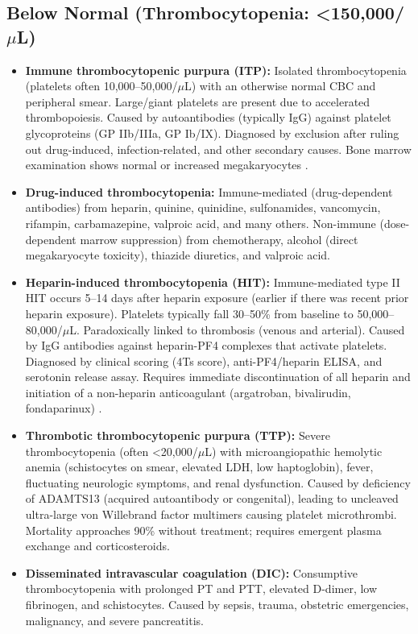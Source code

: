 \subsection*{Below Normal (Thrombocytopenia: <150,000/$\mu$L)}
\begin{itemize}
  \item \textbf{Immune thrombocytopenic purpura (ITP):} Isolated thrombocytopenia (platelets often 10,000--50,000/$\mu$L) with an otherwise normal CBC and peripheral smear. Large/giant platelets are present due to accelerated thrombopoiesis. Caused by autoantibodies (typically IgG) against platelet glycoproteins (GP IIb/IIIa, GP Ib/IX). Diagnosed by exclusion after ruling out drug-induced, infection-related, and other secondary causes. Bone marrow examination shows normal or increased megakaryocytes \cite{neunert2019american}.
  \item \textbf{Drug-induced thrombocytopenia:} Immune-mediated (drug-dependent antibodies) from heparin, quinine, quinidine, sulfonamides, vancomycin, rifampin, carbamazepine, valproic acid, and many others. Non-immune (dose-dependent marrow suppression) from chemotherapy, alcohol (direct megakaryocyte toxicity), thiazide diuretics, and valproic acid.
  \item \textbf{Heparin-induced thrombocytopenia (HIT):} Immune-mediated type II HIT occurs 5--14 days after heparin exposure (earlier if there was recent prior heparin exposure). Platelets typically fall 30--50\% from baseline to 50,000--80,000/$\mu$L. Paradoxically linked to thrombosis (venous and arterial). Caused by IgG antibodies against heparin-PF4 complexes that activate platelets. Diagnosed by clinical scoring (4Ts score), anti-PF4/heparin ELISA, and serotonin release assay. Requires immediate discontinuation of all heparin and initiation of a non-heparin anticoagulant (argatroban, bivalirudin, fondaparinux) \cite{greinacher2015heparin}.
  \item \textbf{Thrombotic thrombocytopenic purpura (TTP):} Severe thrombocytopenia (often <20,000/$\mu$L) with microangiopathic hemolytic anemia (schistocytes on smear, elevated LDH, low haptoglobin), fever, fluctuating neurologic symptoms, and renal dysfunction. Caused by deficiency of ADAMTS13 (acquired autoantibody or congenital), leading to uncleaved ultra-large von Willebrand factor multimers causing platelet microthrombi. Mortality approaches 90\% without treatment; requires emergent plasma exchange and corticosteroids.
  \item \textbf{Disseminated intravascular coagulation (DIC):} Consumptive thrombocytopenia with prolonged PT and PTT, elevated D-dimer, low fibrinogen, and schistocytes. Caused by sepsis, trauma, obstetric emergencies, malignancy, and severe pancreatitis.

\end{itemize}
